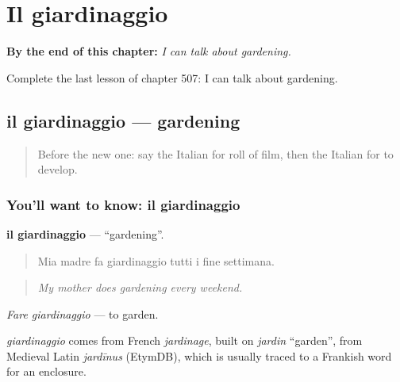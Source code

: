 
\chapter{Il giardinaggio}
\label{ch:it-il-giardinaggio}

\begin{chapteropening}
\textbf{By the end of this chapter:} \emph{I can talk about gardening.}

Complete the last lesson of chapter 507: I can talk about gardening.
\end{chapteropening}

\section[il giardinaggio]{il giardinaggio — gardening}

\label{lesson:IT-C507-giardinaggio}



\begin{quote}
Before the new one: say the Italian for roll of film, then the Italian for to develop.
\end{quote}

\subsection*{You'll want to know: il giardinaggio}
\textbf{il giardinaggio} — \textquotedblleft{}gardening\textquotedblright{}.

\begin{quote}
Mia madre fa giardinaggio tutti i fine settimana.
\end{quote}

\begin{quote}
\emph{My mother does gardening every weekend.}
\end{quote}

\emph{Fare giardinaggio} — to garden.

\begin{cousinweb}
\emph{giardinaggio} comes from French \emph{jardinage}, built on \emph{jardin} \textquotedblleft{}garden\textquotedblright{}, from Medieval Latin \emph{jardīnus} (EtymDB), which is usually traced to a Frankish word for an enclosure.
\end{cousinweb}

